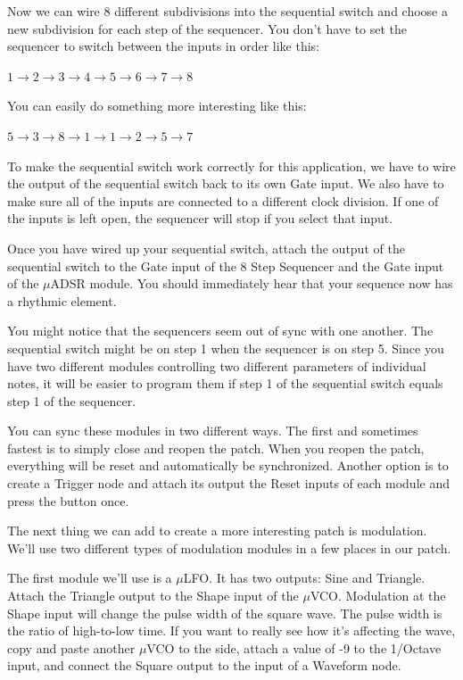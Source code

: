 \documentclass[11pt]{book}
\begin{document}
\begin{multicols*}{2}
Now we can wire 8 different subdivisions into the sequential switch and choose a new subdivision for each step of the sequencer. You don't have to set the sequencer to switch between the inputs in order like this:

\begin{center}
$1 \rightarrow 2 \rightarrow 3 \rightarrow 4 \rightarrow 5 \rightarrow 6 \rightarrow 7 \rightarrow 8$
\end{center}

You can easily do something more interesting like this:

\begin{center}
	$5 \rightarrow 3 \rightarrow 8 \rightarrow 1 \rightarrow 1 \rightarrow 2 \rightarrow 5 \rightarrow 7$
\end{center}


To make the sequential switch work correctly for this application, we have to wire the output of the sequential switch back to its own Gate input. We also have to make sure all of the inputs are connected to a different clock division. If one of the inputs is left open, the sequencer will stop if you select that input.

Once you have wired up your sequential switch, attach the output of the sequential switch to the Gate input of the 8 Step Sequencer and the Gate input of the $\mu$ADSR module. You should immediately hear that your sequence now has a rhythmic element.

You might notice that the sequencers seem out of sync with one another. The sequential switch might be on step 1 when the sequencer is on step 5. Since you have two different modules controlling two different parameters of individual notes, it will be easier to program them if step 1 of the sequential switch equals step 1 of the sequencer.

You can sync these modules in two different ways. The first and sometimes fastest is to simply close and reopen the patch. When you reopen the patch, everything will be reset and automatically be synchronized. Another option is to create a Trigger node and attach its output the Reset inputs of each module and press the button once.

The next thing we can add to create a more interesting patch is modulation. We'll use two different types of modulation modules in a few places in our patch.

The first module we'll use is a $\mu$LFO. It has two outputs: Sine and Triangle. Attach the Triangle output to the Shape input of the $\mu$VCO. Modulation at the Shape input will change the pulse width of the square wave. The pulse width is the ratio of high-to-low time. If you want to really see how it's affecting the wave, copy and paste another $\mu$VCO to the side, attach a value of -9 to the 1/Octave input, and connect the Square output to the input of a Waveform node.


\end{multicols*}
\end{document}
